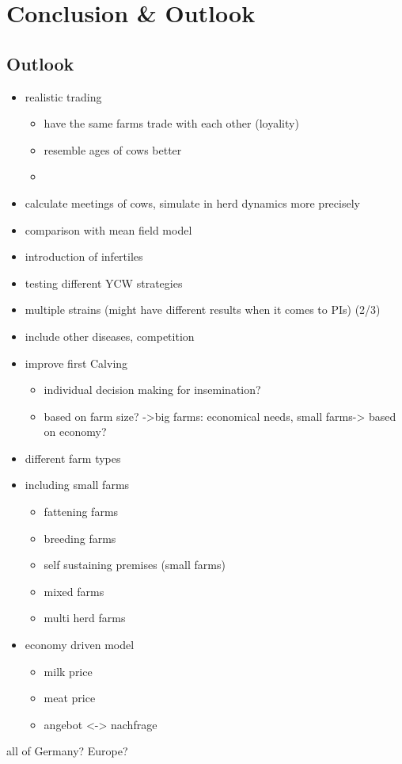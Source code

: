\chapter{Conclusion \& Outlook}
\section{Outlook}
\begin{itemize}
\item realistic trading
\begin{itemize}
\item have the same farms trade with each other (loyality)
\item resemble ages of cows better
\item 
\end{itemize}
\item calculate meetings of cows, simulate in herd dynamics more precisely
\item comparison with mean field model
\item introduction of infertiles
\item testing different YCW strategies
\item multiple strains (might have different results when it comes to PIs) (2/3)
\item include other diseases, competition
\item improve first Calving 
\begin{itemize}
\item individual decision making for insemination? 
\item based on farm size? ->big farms: economical needs, small farms-> based on economy?
\end{itemize}
\item different farm types
\item including small farms
\begin{itemize}
\item fattening farms
\item breeding farms
\item self sustaining premises (small farms)
\item mixed farms
\item multi herd farms
\end{itemize}

\item economy driven model
\begin{itemize}
\item milk price
\item meat price
\item angebot <-> nachfrage
\end{itemize}
\end{itemize}
\item all of Germany? Europe?

